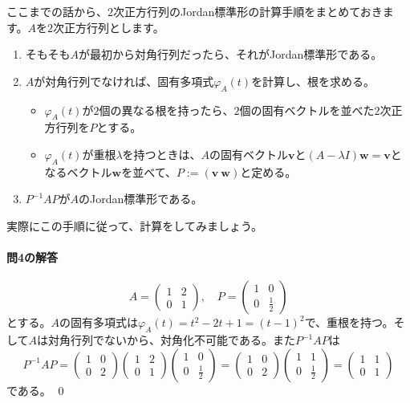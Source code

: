 ここまでの話から、$2$次正方行列のJordan標準形の計算手順をまとめておきます。$A$を$2$次正方行列とします。
\begin{enumerate}
\item そもそも$A$が最初から対角行列だったら、それがJordan標準形である。
\item $A$が対角行列でなければ、固有多項式$\varphi_A(t)$を計算し、根を求める。
\begin{itemize}
\item $\varphi_A(t)$が$2$個の異なる根を持ったら、$2$個の固有ベクトルを並べた$2$次正方行列を$P$とする。
\item $\varphi_A(t)$が重根$\lambda$を持つときは、$A$の固有ベクトル$\bm{v}$と$(A - \lambda I)\bm{w} = \bm{v}$となるベクトル$\bm{w}$を並べて、$P := (\bm{v} \  \bm{w})$と定める。
\end{itemize}
\item $P^{-1} A P$が$A$のJordan標準形である。
\end{enumerate}

実際にこの手順に従って、計算をしてみましょう。

\paragraph{問4の解答}
\[
A = 
\begin{pmatrix}
1 & 2 \\
0 & 1
\end{pmatrix}, \quad
P = 
\begin{pmatrix}
1 & 0 \\
0 & \frac{1}{2}
\end{pmatrix}
\]
とする。$A$の固有多項式は$\varphi_A(t) = t^2 - 2t + 1 = (t - 1)^2$で、重根を持つ。そして$A$は対角行列でないから、対角化不可能である。また$P^{-1} A P$は
\[
P^{-1} A P = 
\begin{pmatrix}
1 & 0 \\
0 & 2
\end{pmatrix}
\begin{pmatrix}
1 & 2 \\
0 & 1
\end{pmatrix}
\begin{pmatrix}
1 & 0 \\
0 & \frac{1}{2}
\end{pmatrix}
=
\begin{pmatrix}
1 & 0 \\
0 & 2
\end{pmatrix}
\begin{pmatrix}
1 & 1 \\
0 & \frac{1}{2}
\end{pmatrix}
=
\begin{pmatrix}
1 & 1 \\
0 & 1
\end{pmatrix}
\]
である。 \qed

